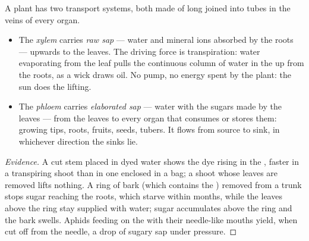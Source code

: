 \begin{proposition}\label{prop:g12:plant-rooted-life:saps}
A plant has two transport systems, both made of long  joined into
tubes in the veins of every organ.
\begin{itemize}
  \item The \emph{xylem} carries \emph{raw sap} --- water
        and mineral ions absorbed by the roots --- upwards to the
        leaves. The driving force is transpiration: water evaporating
        from the leaf  pulls the continuous column of water in
        the  up from the roots, as a wick draws oil. No pump, no
        energy spent by the plant: the sun does the lifting.
  \item The \emph{phloem} carries \emph{elaborated sap}
        --- water with the sugars made by the leaves --- from the
        leaves to every organ that consumes or stores them: growing
        tips, roots, fruits, seeds, tubers. It flows from source to
        sink, in whichever direction the sinks lie.
\end{itemize}
\end{proposition}
\begin{proof}[Evidence]
A cut stem placed in dyed water shows the dye rising in the ,
faster in a transpiring shoot than in one enclosed in a bag; a shoot
whose leaves are removed lifts nothing. A ring of bark (which contains
the ) removed from a trunk stops sugar reaching the roots, which
starve within months, while the leaves above the ring stay supplied
with water; sugar accumulates above the ring and the bark swells. Aphids
feeding on the  with their needle-like mouths yield, when cut off
from the needle, a drop of sugary sap under pressure.
\end{proof}

